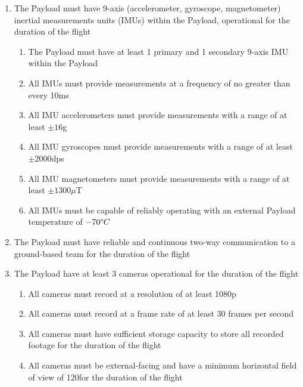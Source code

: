 \documentclass{article}
\begin{document}
\begin{enumerate}
\begin{enumerate}
            \item All altitude measurement units must provide measurements at a frequency of no greater than every 5 seconds
            \item All altitude measurements must provide measurements with an accuracy of no greater than $\pm 20$m
            \item All altitude measurement units must be capable of reliably operating with an external payload ambient temperature of $-70\degree C$
        \end{enumerate}
    \item The Payload must have 9-axis (accelerometer, gyroscope, magnetometer) inertial measurements units (IMUs) within the Payload, operational for the duration of the flight
        \begin{enumerate}
            \item The Payload must have at least 1 primary and 1 secondary 9-axis IMU within the Payload
            \item All IMUs must provide measurements at a frequency of no greater than every 10ms
            \item All IMU accelerometers must provide measurements with a range of at least $\pm 16$g
            \item All IMU gyroscopes must provide measurements with a range of at least $\pm 2000$dps
            \item All IMU magnetometers must provide measurements with a range of at least $\pm 1300\mu $T
            \item All IMUs must be capable of reliably operating with an external Payload temperature of $-70\degree C$
        \end{enumerate}
    \item The Payload must have reliable and continuous two-way communication to a ground-based team for the duration of the flight
    \item The Payload have at least 3 cameras operational for the duration of the flight
        \begin{enumerate}
            \item All cameras must record at a resolution of at least 1080p
            \item All cameras must record at a frame rate of at least 30 frames per second
            \item All cameras must have sufficient storage capacity to store all recorded footage for the duration of the flight
            \item All cameras must be external-facing and have a minimum horizontal field of view of 120\textdegree for the duration of the flight

\end{enumerate}
\end{enumerate}
\end{document}
